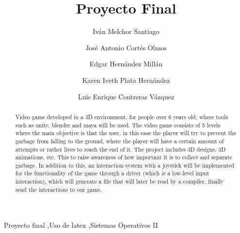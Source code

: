 \documentclass[preprint,12pt]{elsarticle}
\begin{document}
\begin{frontmatter}


\title{Proyecto Final}




\author{Iván Melchor Santiago}
\author{José Antonio Cortés Olmos}
\author{Edgar Hernández Millán}
\author{Karen Iveth Plata Hernández}
\author{Luis Enrique Contreras Vázquez}

\address{Universidad La Salle, Ciudad de México}

\begin{abstract}
Video game developed in a 3D environment, for people over 6 years old, where tools such as unity, blender and maya will be used. The video game consists of 5 levels where the main objective is that the user, in this case the player will try to prevent the garbage from falling to the ground, where the player will have a certain amount of attempts or rather lives to reach the end of it. The project includes 3D designs, 3D animations, etc. This to raise awareness of how important it is to collect and separate garbage. In addition to this, an interaction system with a joystick will be implemented for the functionality of the game through a driver (which is a low-level input interaction), which will generate a file that will later be read by a compiler, finally send the interactions to our game.
\end{abstract}

\begin{keyword}
Proyecto final \sep Uso de latex \sep Sistemas Operativos II


\end{keyword}

\end{frontmatter}
\end{document}

